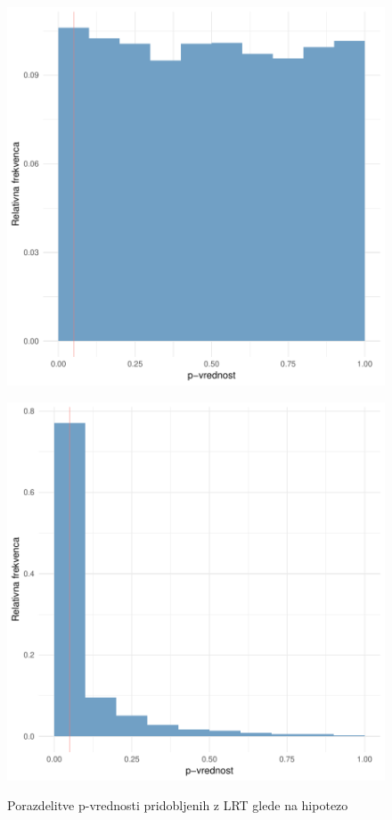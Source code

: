 \documentclass[letterpaper,11pt]{article}
\begin{document}
\begin{figure}[h]
  \centering
  \begin{minipage}[b]{.4\linewidth}
    \centering
    \includegraphics{stadij_H0_M_S1}
    \label{fig:1a}
  \end{minipage}%
  \begin{minipage}[b]{.4\linewidth}
    \centering
    \includegraphics{stadij_HA_M_S1}
    \label{fig:1b}
  \end{minipage}
  \caption{Porazdelitve p-vrednosti pridobljenih z LRT glede na hipotezo}
  \label{fig:1}
\end{figure}
\end{document}
